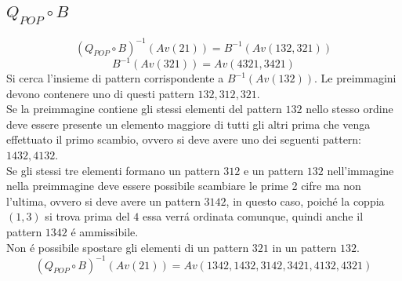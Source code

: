\subsection*{$Q_{POP}\circ{B}$}$$(Q_{POP}\circ{B})^{-1}(Av(21))=B^{-1}(Av(132,321))$$$$B^{-1}(Av(321))=Av(4321, 3421)$$
Si cerca l'insieme di pattern corrispondente a $B^{-1}(Av(132))$. Le preimmagini devono contenere uno di questi pattern $132,312,321$.\\
Se la preimmagine contiene gli stessi elementi del pattern $132$ nello stesso ordine deve essere presente un elemento maggiore di tutti gli altri prima che venga effettuato il primo scambio, ovvero si deve avere uno dei seguenti pattern: $1432,4132$.\\
Se gli stessi tre elementi formano un pattern $312$ e un pattern $132$ nell'immagine nella preimmagine deve essere possibile scambiare le prime 2 cifre ma non l'ultima, ovvero si deve avere un pattern $3142$, in questo caso, poich\'e la coppia $(1,3)$ si trova prima del $4$ essa verr\'a ordinata comunque, quindi anche il pattern $1342$ \'e ammissibile.\\
Non \'e possibile spostare gli elementi di un pattern $321$ in un pattern $132$.
$$(Q_{POP}\circ{B})^{-1}(Av(21))=Av(1342, 1432, 3142, 3421, 4132, 4321)$$
